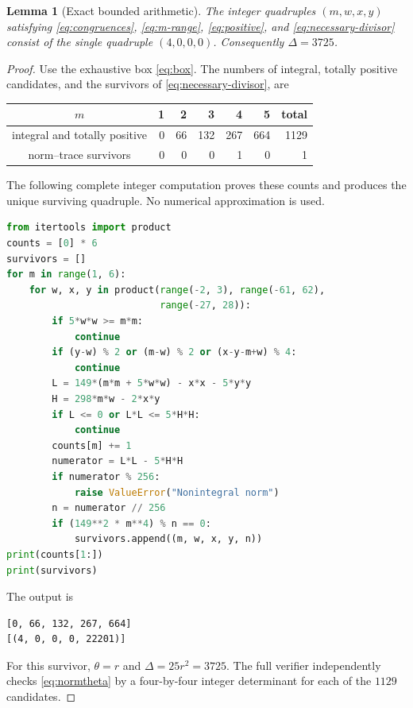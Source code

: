 \documentclass[11pt]{article}
\newtheorem{lemma}[theorem]{Lemma}
\numberwithin{equation}{section}
\begin{document}
\begin{lemma}[Exact bounded arithmetic]\label{lem:finite}
The integer quadruples $(m,w,x,y)$ satisfying
\eqref{eq:congruences}, \eqref{eq:m-range}, \eqref{eq:positive}, and
\eqref{eq:necessary-divisor} consist of the single quadruple $(4,0,0,0)$.
Consequently $\Delta=3725$.
\end{lemma}
\begin{proof}
Use the exhaustive box \eqref{eq:box}. The numbers of integral, totally
positive candidates, and the survivors of \eqref{eq:necessary-divisor}, are
\begin{center}
\begin{tabular}{c|rrrrr|r}
$m$ & 1 & 2 & 3 & 4 & 5 & total\\ \hline
integral and totally positive & 0 & 66 & 132 & 267 & 664 & 1129\\
norm--trace survivors & 0 & 0 & 0 & 1 & 0 & 1
\end{tabular}
\end{center}
The following complete integer computation proves these counts and produces
the unique surviving quadruple. No numerical approximation is used.
\begin{lstlisting}[language=Python]
from itertools import product
counts = [0] * 6
survivors = []
for m in range(1, 6):
    for w, x, y in product(range(-2, 3), range(-61, 62),
                           range(-27, 28)):
        if 5*w*w >= m*m:
            continue
        if (y-w) % 2 or (m-w) % 2 or (x-y-m+w) % 4:
            continue
        L = 149*(m*m + 5*w*w) - x*x - 5*y*y
        H = 298*m*w - 2*x*y
        if L <= 0 or L*L <= 5*H*H:
            continue
        counts[m] += 1
        numerator = L*L - 5*H*H
        if numerator % 256:
            raise ValueError("Nonintegral norm")
        n = numerator // 256
        if (149**2 * m**4) % n == 0:
            survivors.append((m, w, x, y, n))
print(counts[1:])
print(survivors)
\end{lstlisting}
The output is
\begin{lstlisting}
[0, 66, 132, 267, 664]
[(4, 0, 0, 0, 22201)]
\end{lstlisting}
For this survivor, $\theta=r$ and $\Delta=25r^2=3725$.
The full verifier independently checks \eqref{eq:normtheta} by a
four-by-four integer determinant for each of the $1129$ candidates.
\end{proof}
\end{document}
